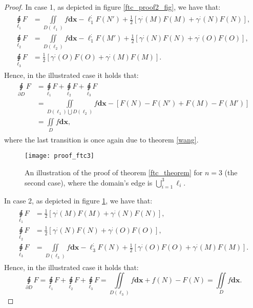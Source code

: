\documentclass[11pt]{book}
\begin{document}
\begin{proof}
In case 1, as depicted in figure \ref{ftc_proof2_fig}, we have that:
\begin{align}
\begin{aligned}
\underset{\ell_{1}}{\sqint}F & =\underset{D\left(\ell_{1}\right)}{\iint}f\boldsymbol{dx}-\ell_{1}^{;}F\left(N'\right)+\frac{1}{2}\left[\gamma^{;}\left(M\right)F\left(M\right)+\gamma^{;}\left(N\right)F\left(N\right)\right],\\
\underset{\ell_{2}}{\sqint}F & =\underset{D\left(\ell_{2}\right)}{\iint}f\boldsymbol{dx}-\ell_{1}^{;}F\left(M'\right)+\frac{1}{2}\left[\gamma^{;}\left(N\right)F\left(N\right)+\gamma^{;}\left(O\right)F\left(O\right)\right],\\
\underset{\ell_{3}}{\sqint}F & =\frac{1}{2}\left[\gamma^{;}\left(O\right)F\left(O\right)+\gamma^{;}\left(M\right)F\left(M\right)\right].
\end{aligned}
\end{align}
Hence, in the illustrated case it holds that:
\begin{align}
\begin{aligned}
\underset{\partial D}{\sqint}F & =\underset{\ell_{1}}{\sqint}F+\underset{\ell_{2}}{\sqint}F+\underset{\ell_{3}}{\sqint}F\\
 & =\underset{D\left(\ell_{1}\right)\bigcup D\left(\ell_{2}\right)}{\iint}f\boldsymbol{dx}-\left[F\left(N\right)-F\left(N'\right)+F\left(M\right)-F\left(M'\right)\right]\\
 & =\underset{D}{\iint}f\boldsymbol{dx},
\end{aligned}
\end{align}
where the last transition is once again due to theorem \ref{wang}.

\begin{figure}
\texttt{[image: proof\_ftc3]}
\caption{An illustration of the proof of theorem \ref{ftc_theorem} for $n=3$ (the second case), where the domain’s edge is $\bigcup_{i=1}^{3}\ell_{i}$.}
\label{ftc_proof3_fig}
\end{figure}

In case 2, as depicted in figure \ref{ftc_proof3_fig}, we have that:
\begin{align}
\begin{aligned}
\underset{\ell_{1}}{\sqint}F & =\frac{1}{2}\left[\gamma^{;}\left(M\right)F\left(M\right)+\gamma^{;}\left(N\right)F\left(N\right)\right],\\
\underset{\ell_{2}}{\sqint}F & =\frac{1}{2}\left[\gamma^{;}\left(N\right)F\left(N\right)+\gamma^{;}\left(O\right)F\left(O\right)\right],\\
\underset{\ell_{3}}{\sqint}F & =\underset{D\left(\ell_{3}\right)}{\iint}f\boldsymbol{dx}-\ell_{3}^{;}F\left(N\right)+\frac{1}{2}\left[\gamma^{;}\left(O\right)F\left(O\right)+\gamma^{;}\left(M\right)F\left(M\right)\right].
\end{aligned}
\end{align}
Hence, in the illustrated case it holds that:
\[
\underset{\partial D}{\sqint}F=\underset{\ell_{1}}{\sqint}F+\underset{\ell_{2}}{\sqint}F+\underset{\ell_{3}}{\sqint}F=\underset{D\left(\ell_{3}\right)}{\iint}f\boldsymbol{dx}+f\left(N\right)-F\left(N\right)=\underset{D}{\iint}f\boldsymbol{dx}.
\]


\end{proof}
\end{document}
